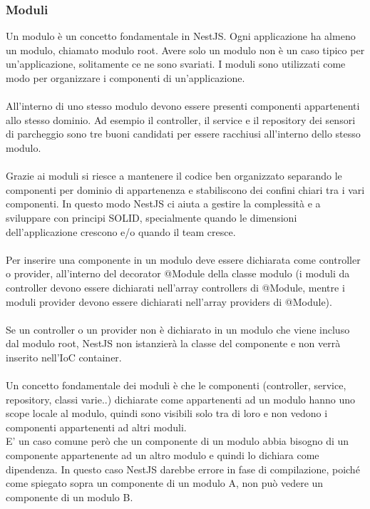 \subsubsection{Moduli}
Un modulo è un concetto fondamentale in NestJS. Ogni applicazione ha almeno un modulo, chiamato modulo root. 
Avere solo un modulo non è un caso tipico per un'applicazione, solitamente ce ne sono svariati.
I moduli sono utilizzati come modo per organizzare i componenti di un'applicazione.
\\\\
All'interno di uno stesso modulo devono essere presenti componenti appartenenti allo stesso dominio. Ad esempio
il controller, il service e il repository dei sensori di parcheggio sono tre buoni candidati per essere racchiusi 
all'interno dello stesso modulo.
\\\\
Grazie ai moduli si riesce a mantenere il codice ben organizzato separando le componenti per dominio di appartenenza
e stabiliscono dei confini chiari tra i vari componenti. In questo modo NestJS ci aiuta a gestire la complessità e a 
sviluppare con principi SOLID, specialmente quando le dimensioni dell'applicazione crescono e/o quando il team cresce.
\\\\
Per inserire una componente in un modulo deve essere dichiarata come controller o provider, all'interno del decorator
@Module della classe modulo (i moduli da controller devono essere dichiarati nell'array controllers di @Module,
mentre i moduli provider devono essere dichiarati nell'array providers di @Module). 
\\\\
Se un controller o un provider non è dichiarato in un modulo che viene incluso dal modulo
root, NestJS non istanzierà la classe del componente e non verrà inserito nell'IoC container.
\\\\
Un concetto fondamentale dei moduli è che le componenti (controller, service, repository, classi varie..) dichiarate 
come appartenenti ad un modulo hanno uno scope locale al modulo, quindi sono visibili solo tra di loro e non vedono
i componenti appartenenti ad altri moduli.
\\
E' un caso comune però che un componente di un modulo abbia bisogno di un componente appartenente ad un altro modulo
e quindi lo dichiara come dipendenza. In questo caso NestJS darebbe errore in fase di compilazione, poiché come 
spiegato sopra un componente di un modulo A, non può vedere un componente di un modulo B.
